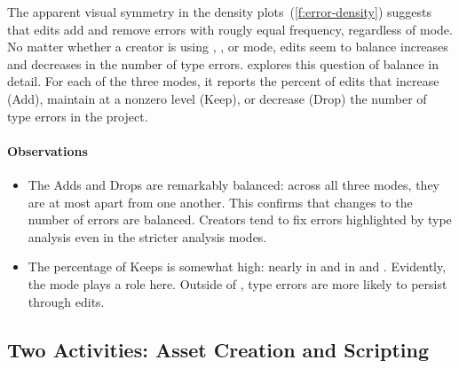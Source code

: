 \documentclass[english,submission,cleveref]{programming}
\begin{document}
The apparent visual symmetry in the density plots~(\cref{f:error-density})
suggests that edits add and remove errors with rougly equal frequency,
regardless of mode.
No matter whether a creator is using \mnocheck{}, \mnonstrict{},
or \mstrict{} mode, edits seem to balance increases and decreases in the number
of type errors.
 explores this question of balance in detail.
For each of the three modes, it reports the percent of edits that increase (Add),
maintain at a nonzero level (Keep), or decrease (Drop) the number of type
errors in the project.


\paragraph{Observations}

\begin{itemize}
  \item
    The Adds and Drops are remarkably balanced: across all three modes, they are
    at most  apart from one another.
    This confirms that changes to the number of errors are balanced.
    Creators tend to fix errors highlighted by type analysis
    even in the stricter analysis modes.

  \item
    The percentage of Keeps is somewhat high: nearly  in \mnocheck{}
    and  in \mnonstrict{} and \mstrict{}.
    Evidently, the mode plays a role here.
    Outside of \mnocheck{}, type errors are more likely to persist through edits.

\end{itemize}


\subsection{Two Activities: Asset Creation and Scripting}
\end{document}
